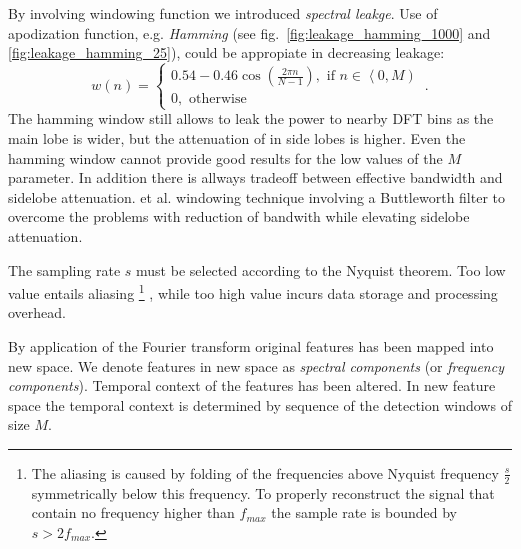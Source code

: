 By involving windowing function we introduced
\emph{spectral leakge}. Use of apodization function, e.g. \emph{Hamming} %
(see fig.~\ref{fig:leakage_hamming_1000} and \ref{fig:leakage_hamming_25}),
could be appropiate in decreasing leakage:
\begin{equation}\label{eq:hamm}
w(n) = \left\lbrace \begin{array}{l} 
0.54 - 0.46\cos \left ( \frac{2\pi n}{N-1} \right), \mbox{ if } n\in \left\langle 0, M \right) \\
 0, \mbox{ otherwise} \end{array}\right. \,.
\end{equation}
The hamming window still allows to leak the power to nearby DFT bins as the
main lobe is wider, but the attenuation of in side lobes is higher.
Even the hamming window cannot provide good results for the low values of the $M$ 
parameter. In addition there is allways tradeoff between effective bandwidth and
sidelobe attenuation.  et al. \cite{yoon2009butterworth} windowing technique 
involving a Buttleworth filter to overcome the problems with reduction of bandwith 
while elevating sidelobe attenuation.

The sampling rate $s$ must be selected according to the Nyquist theorem. 
Too low value entails aliasing%
\footnote{
    The aliasing is caused by folding of the frequencies above Nyquist frequency
    $\frac{s}{2}$ symmetrically below this frequency. 
    To properly reconstruct the signal that contain no frequency higher than $f_{max}$ 
    the sample rate is bounded by $s > 2f_{max}$.
}%
, while too high value incurs data storage and processing overhead. 

By application of the Fourier transform original features has been mapped into new space.
We denote features in new space as \emph{spectral components} (or \emph{frequency components}).
Temporal context of the features has been altered. 
In new feature space the temporal context is determined by sequence
of the detection windows of size $M$. 

